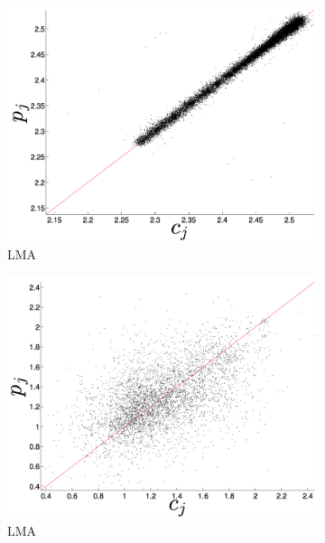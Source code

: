 \begin{figure}[htbp]
      \begin{subfigure}{0.32\columnwidth}
    \includegraphics[width=\columnwidth]{figs/colLMAForecast.png}
    \caption{\col LMA}
    \label{fig:colLMA}
  \end{subfigure}
      \begin{subfigure}{0.32\columnwidth}
    \includegraphics[width=\columnwidth]{figs/gccLMAForecast.png}
    \caption{\gcc LMA}
    \label{fig:gccLMA}
  \end{subfigure}  
        \begin{subfigure}{0.32\columnwidth}

\end{subfigure}
\end{figure}
